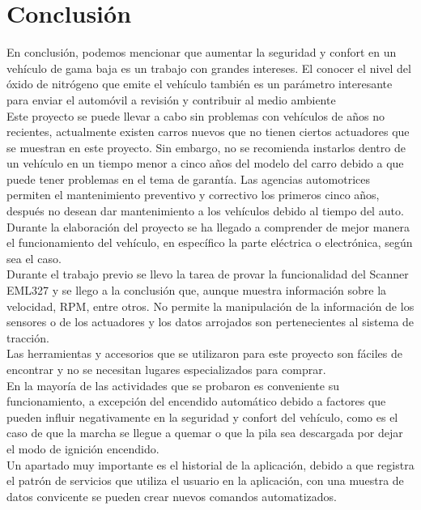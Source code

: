 \section{Conclusión}

En conclusión, podemos mencionar que aumentar la seguridad y confort en un vehículo de gama baja es un trabajo con grandes intereses. El conocer el nivel del óxido de nitrógeno que emite el vehículo también es un parámetro interesante para enviar el automóvil a revisión y contribuir al medio ambiente\\

Este proyecto se puede llevar a cabo sin problemas con vehículos de años no recientes, actualmente existen carros nuevos que no tienen ciertos actuadores que se muestran en este proyecto. Sin embargo, no se recomienda instarlos dentro de un vehículo en un tiempo menor a cinco años del modelo del carro debido a que puede tener problemas en el tema de garantía. Las agencias automotrices permiten el mantenimiento preventivo y correctivo los primeros cinco años, después no desean dar mantenimiento a los vehículos debido al tiempo del auto.\\

Durante la elaboración del proyecto se ha llegado a comprender de mejor manera el funcionamiento del vehículo, en específico la parte eléctrica o electrónica, según sea el caso.\\

Durante el trabajo previo se llevo la tarea de provar la funcionalidad del Scanner EML327 y se llego a la conclusión que, aunque muestra información sobre la velocidad, RPM, entre otros. No permite la manipulación de la información de los sensores o de los actuadores y los datos arrojados son pertenecientes al sistema de tracción.\\

Las herramientas y accesorios que se utilizaron para este proyecto son fáciles de encontrar y no se necesitan lugares especializados para comprar. \\
En la mayoría de las actividades que se probaron es conveniente su funcionamiento, a excepción del encendido automático debido a factores que pueden influir negativamente en la seguridad y confort del vehículo, como es el caso de que la marcha se llegue a quemar o que la pila sea descargada por dejar el modo de ignición encendido.\\

Un apartado muy importante es el historial de la aplicación, debido a que registra el patrón de servicios que utiliza el usuario en la aplicación, con una muestra de datos convicente se pueden crear nuevos comandos automatizados.\\


